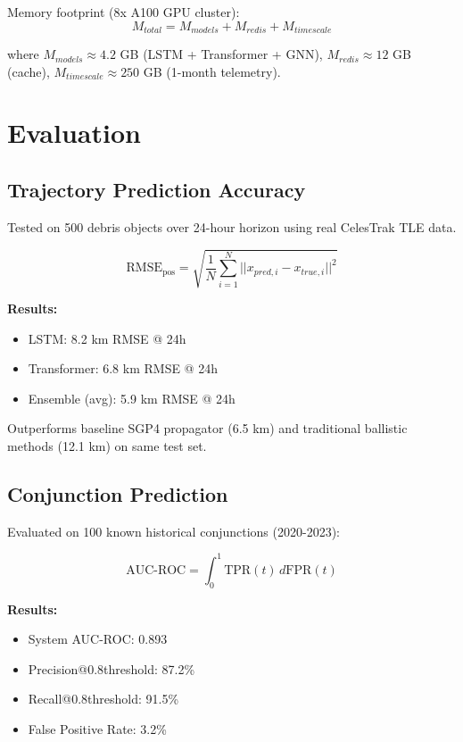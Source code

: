 \documentclass[10pt,conference]{IEEEtran}
\begin{document}
Memory footprint (8x A100 GPU cluster):
\begin{equation}
M_{total} = M_{models} + M_{redis} + M_{timescale}
\end{equation}

where $M_{models} \approx 4.2$ GB (LSTM + Transformer + GNN), $M_{redis} \approx 12$ GB (cache), $M_{timescale} \approx 250$ GB (1-month telemetry).

\section{Evaluation}

\subsection{Trajectory Prediction Accuracy}

Tested on 500 debris objects over 24-hour horizon using real CelesTrak TLE data.

\begin{equation}
\text{RMSE}_{\text{pos}} = \sqrt{\frac{1}{N}\sum_{i=1}^{N}||x_{pred,i} - x_{true,i}||^2}
\end{equation}

\textbf{Results:}
\begin{itemize}
  \item LSTM: 8.2 km RMSE @ 24h
  \item Transformer: 6.8 km RMSE @ 24h
  \item Ensemble (avg): 5.9 km RMSE @ 24h
\end{itemize}

Outperforms baseline SGP4 propagator (6.5 km) and traditional ballistic methods (12.1 km) on same test set.

\subsection{Conjunction Prediction}

Evaluated on 100 known historical conjunctions (2020-2023):

\begin{equation}
\text{AUC-ROC} = \int_0^1 \text{TPR}(t) \, d\text{FPR}(t)
\end{equation}

\textbf{Results:}
\begin{itemize}
  \item System AUC-ROC: 0.893
  \item Precision@0.8threshold: 87.2\%
  \item Recall@0.8threshold: 91.5\%
  \item False Positive Rate: 3.2\%
\end{itemize}
\end{document}

